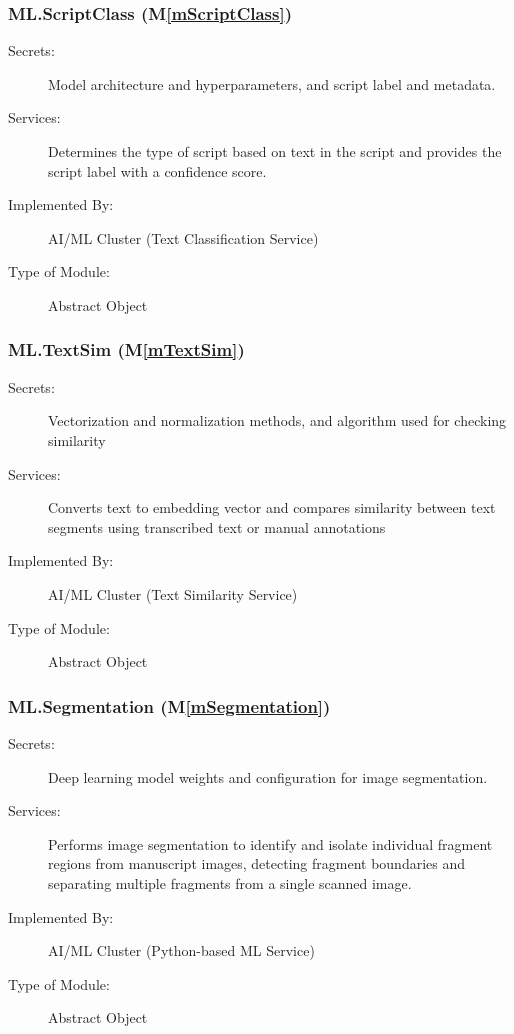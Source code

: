 \documentclass[12pt, titlepage]{article}
\newcommand{\mref}[1]{M\ref{#1}}
\begin{document}
\subsubsection{ML.ScriptClass (\mref{mScriptClass})}

\begin{description}
\item[Secrets:] Model architecture and hyperparameters, and script label and metadata.
\item[Services:] Determines the type of script based on text in the script and provides the script label with a confidence score.
\item[Implemented By:] AI/ML Cluster (Text Classification Service)
\item[Type of Module:] Abstract Object
\end{description}


\subsubsection{ML.TextSim (\mref{mTextSim})}

\begin{description}
\item[Secrets:] Vectorization and normalization methods, and algorithm used for checking similarity
\item[Services:] Converts text to embedding vector and compares similarity between text segments using transcribed text or manual annotations
\item[Implemented By:] AI/ML Cluster (Text Similarity Service)
\item[Type of Module:] Abstract Object
\end{description}


\subsubsection{ML.Segmentation (\mref{mSegmentation})}

\begin{description}
\item[Secrets:] Deep learning model weights and configuration for image segmentation.
\item[Services:] Performs image segmentation to identify and isolate individual fragment regions from manuscript images, detecting fragment boundaries and separating multiple fragments from a single scanned image.
\item[Implemented By:] AI/ML Cluster (Python-based ML Service)
\item[Type of Module:] Abstract Object
\end{description}
\end{document}
